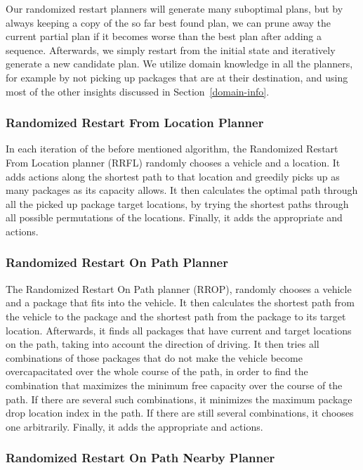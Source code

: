 Our randomized restart planners will generate many suboptimal plans,
but by always keeping a copy of the so far best found plan,
we can prune away the current partial plan if it becomes
worse than the best plan after adding a sequence.
Afterwards, we simply restart
from the initial state and iteratively generate a new candidate plan.
We utilize domain knowledge in all the planners,
for example by not picking up packages that are at their destination,
and using most of the other insights discussed in Section~\ref{domain-info}.

\subsubsection{Randomized Restart From Location Planner}\label{rrfl}

In each iteration of the before mentioned algorithm,
the Randomized Restart From Location planner (RRFL)
randomly chooses a vehicle and a location.
It adds \drive{} actions along the shortest path
to that location and greedily picks up as many packages as
its capacity allows.
It then calculates the optimal
path through all the picked up package target locations,
by trying the shortest paths through all possible permutations
of the locations.
Finally, it adds the appropriate \drive{} and \drop{} actions.

\subsubsection{Randomized Restart On Path Planner}\label{rrop}

The Randomized Restart On Path planner (RROP),
randomly chooses a vehicle
and a package that fits into the vehicle.
It then calculates the shortest path from the vehicle
to the package
and the shortest path from the package to its target location.
Afterwards, it finds all packages that have current and target locations on the path, taking into account the direction of driving.
It then tries all combinations of
those packages that do not make the vehicle become
overcapacitated over the whole course
of the path, in order
to find the combination that maximizes the minimum
free capacity over the course of the path.
If there are several such combinations, it minimizes the
maximum package drop location index in the path.
If there are still several combinations, it chooses one arbitrarily.
Finally, it adds the appropriate \drive{} and \drop{} actions.

\subsubsection{Randomized Restart On Path Nearby Planner}\label{rropn}

